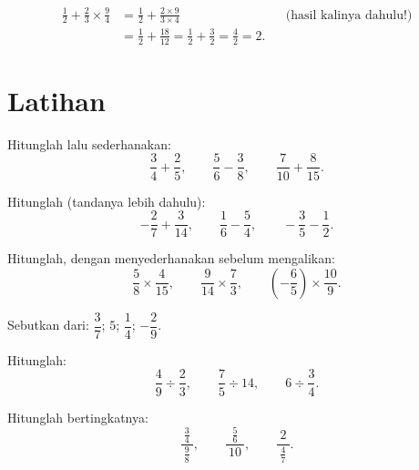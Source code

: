 \begin{example}\label{ex:g8:fractions:mixed}
\begin{align*}
\frac12 + \frac{2}{3} \times \frac{9}{4}
&= \frac12 + \frac{2 \times 9}{3 \times 4}
&& \text{(hasil kalinya dahulu!)} \\
&= \frac12 + \frac{18}{12} = \frac12 + \frac32
= \frac{4}{2} = 2 .
\end{align*}
\end{example}

\section{Latihan}

\begin{exercise}[$\star$]\label{exo:g8:fractions:1}
Hitunglah lalu sederhanakan:
\[
\frac{3}{4} + \frac{2}{5}, \qquad
\frac{5}{6} - \frac{3}{8}, \qquad
\frac{7}{10} + \frac{8}{15} .
\]
\end{exercise}

\begin{exercise}[$\star$]\label{exo:g8:fractions:2}
Hitunglah (tandanya lebih dahulu):
\[
-\frac{2}{7} + \frac{3}{14}, \qquad
\frac{1}{6} - \frac{5}{4}, \qquad
-\frac{3}{5} - \frac{1}{2} .
\]
\end{exercise}

\begin{exercise}[$\star$]\label{exo:g8:fractions:3}
Hitunglah, dengan menyederhanakan sebelum mengalikan:
\[
\frac{5}{8} \times \frac{4}{15}, \qquad
\frac{9}{14} \times \frac{7}{3}, \qquad
\left(-\frac{6}{5}\right) \times \frac{10}{9} .
\]
\end{exercise}

\begin{exercise}[$\star$]\label{exo:g8:fractions:4}
Sebutkan  dari: $\dfrac{3}{7}$; \quad $5$; \quad
$\dfrac{1}{4}$; \quad $-\dfrac{2}{9}$.
\end{exercise}

\begin{exercise}[$\star$]\label{exo:g8:fractions:5}
Hitunglah:
\[
\frac{4}{9} \div \frac{2}{3}, \qquad
\frac{7}{5} \div 14, \qquad
6 \div \frac{3}{4} .
\]
\end{exercise}

\begin{exercise}[$\star$]\label{exo:g8:fractions:6}
Hitunglah  bertingkatnya:
\[
\frac{\ \frac{3}{4}\ }{\ \frac{9}{8}\ },
\qquad
\frac{\ \frac{5}{6}\ }{\ 10\ },
\qquad
\frac{\ 2\ }{\ \frac{4}{7}\ } .
\]
\end{exercise}

